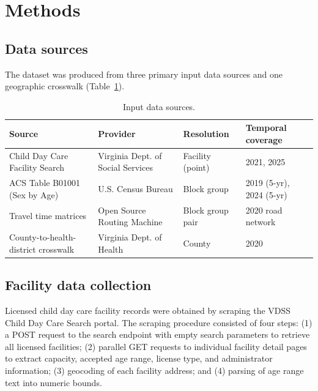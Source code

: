 \documentclass{CUP-JNL-DAP}%
\begin{document}

\section{Methods}

\subsection{Data sources}

The dataset was produced from three primary input data sources and one geographic crosswalk (Table~\ref{tab:sources}).

\begin{table}[ht]
\centering
\caption{Input data sources.}
\label{tab:sources}
\small
\begin{tabularx}{\textwidth}{lllX}
\toprule
Source & Provider & Resolution & Temporal coverage \\
\midrule
Child Day Care Facility Search\citep{vdss} & Virginia Dept. of Social Services & Facility (point) & 2021, 2025 \\
ACS Table B01001 (Sex by Age)\citep{acs} & U.S. Census Bureau & Block group & 2019 (5-yr), 2024 (5-yr) \\
Travel time matrices\citep{luxen2011} & Open Source Routing Machine & Block group pair & 2020 road network \\
County-to-health-district crosswalk\citep{vdh2020} & Virginia Dept. of Health & County & 2020 \\
\bottomrule
\end{tabularx}
\end{table}

\subsection{Facility data collection}

Licensed child day care facility records were obtained by scraping the VDSS Child Day Care Search portal\citep{vdss}. The scraping procedure consisted of four steps: (1) a POST request to the search endpoint with empty search parameters to retrieve all licensed facilities; (2) parallel GET requests to individual facility detail pages to extract capacity, accepted age range, license type, and administrator information; (3) geocoding of each facility address; and (4) parsing of age range text into numeric bounds.
\end{document}
